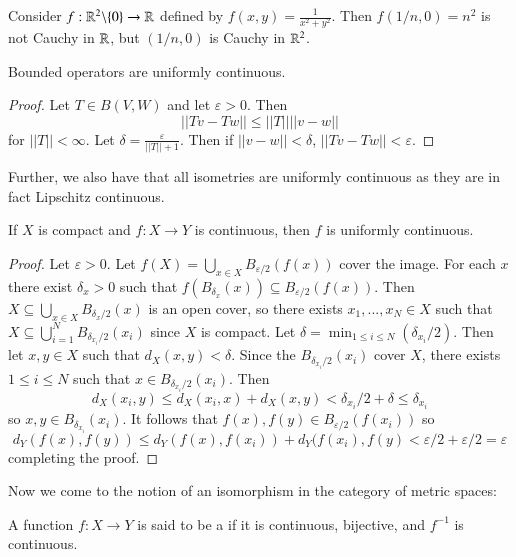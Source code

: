 \begin{eg}
    Consider $f:\mathbb R^2\backslash \{0\}\rightarrow \mathbb R$ defined by $f(x,y) = \frac{1}{x^2+y^2}$. Then $f(1/n,0) = n^2$ is not Cauchy in $\mathbb R$, but $(1/n,0)$ is Cauchy in $\mathbb R^2$.
\end{eg}

\begin{prop}
    Bounded operators are uniformly continuous.
\end{prop}
\begin{proof}
    Let $T \in B(V,W)$ and let $\varepsilon > 0$. Then $$||Tv - Tw|| \leq ||T||||v-w||$$ for $||T|| < \infty$. Let $\delta = \frac{\varepsilon}{||T||+1}$. Then if $||v-w|| < \delta$, $||Tv-Tw|| < \varepsilon$.
\end{proof}

Further, we also have that all isometries are uniformly continuous as they are in fact Lipschitz continuous.

\begin{prop}\label{prop:3.1.4}
    If $X$ is compact and $f:X\rightarrow Y$ is continuous, then $f$ is uniformly continuous.
\end{prop}
\begin{proof}
    Let $\varepsilon >0$. Let $f(X) = \bigcup_{x \in X}B_{\varepsilon/2}(f(x))$ cover the image. For each $x$ there exist $\delta_x > 0$ such that $f(B_{\delta_x}(x)) \subseteq B_{\varepsilon/2}(f(x))$. Then $X \subseteq \bigcup_{x\in X}B_{\delta_x/2}(x)$ is an open cover, so there exists $x_1,...,x_N \in X$ such that $X \subseteq \bigcup_{i=1}^NB_{\delta_{x_i}/2}(x_i)$ since $X$ is compact. Let $\delta = \min_{1\leq i \leq N}(\delta_{x_i}/2)$. Then let $x,y \in X$ such that $d_X(x,y) < \delta$. Since the $B_{\delta_{x_i}/2}(x_i)$ cover $X$, there exists $1 \leq i \leq N$ such that $x \in B_{\delta_{x_i}/2}(x_i)$. Then $$d_X(x_i,y) \leq d_X(x_i,x) + d_X(x,y) < \delta_{x_i}/2+\delta \leq \delta_{x_i}$$ so $x,y \in B_{\delta_{x_i}}(x_i)$. It follows that $f(x),f(y) \in B_{\varepsilon/2}(f(x_i))$ so $$d_Y(f(x),f(y)) \leq d_Y(f(x),f(x_i)) + d_Y(f(x_i),f(y) < \varepsilon/2+\varepsilon/2 = \varepsilon$$
    completing the proof.
\end{proof}

Now we come to the notion of an isomorphism in the category of metric spaces:

\begin{defn}
    A function $f:X\rightarrow Y$ is said to be a  if it is continuous, bijective, and $f^{-1}$ is continuous.
\end{defn}

